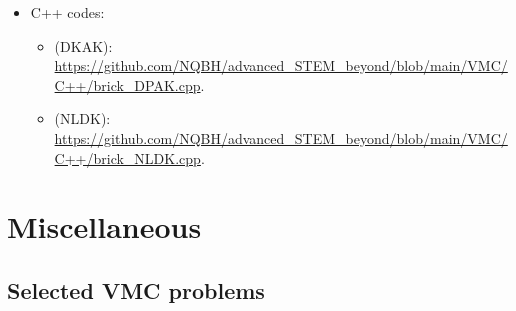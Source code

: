 \documentclass{article}
\begin{document}
\begin{itemize}
	\item C++ codes:
	\begin{itemize}
		\item (DKAK): \url{https://github.com/NQBH/advanced_STEM_beyond/blob/main/VMC/C++/brick_DPAK.cpp}.
		\item (NLDK): \url{https://github.com/NQBH/advanced_STEM_beyond/blob/main/VMC/C++/brick_NLDK.cpp}.
	\end{itemize}
\end{itemize}


\section{Miscellaneous}

\subsection{Selected VMC problems}
\end{document}
